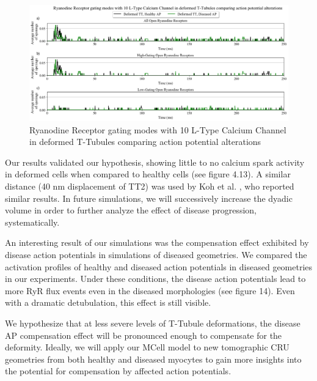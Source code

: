\documentclass[12pt]{ucsddissertation}
\begin{document}
\setcounter{figure}{13}
\begin{figure}
\centering
	\includegraphics[scale=0.4]{dndd10RyR_r_Comparison.png}
	\caption{Ryanodine Receptor gating modes with 10 L-Type Calcium Channel in deformed T-Tubules comparing action potential alterations}
\label{fig:hnhd 4 LTCC 1 AP RyR} 
\end{figure}

Our results validated our hypothesis, showing little to no calcium spark activity in deformed cells when compared to healthy cells (see figure 4.13). A similar distance (40 nm displacement of TT2) was used by Koh et al. \cite{Koh2006}, who reported similar results. In future simulations, we will successively increase the dyadic volume in order to further analyze the effect of disease progression, systematically. 


An interesting result of our simulations was the compensation effect exhibited by disease action potentials in simulations of diseased geometries. We compared the activation profiles of healthy and diseased action potentials in diseased geometries in our experiments. Under these conditions, the disease action potentials lead to more RyR flux events even in the diseased morphologies (see figure 14). Even with a dramatic detubulation, this effect is still visible.

We hypothesize that at less severe levels of T-Tubule deformations, the disease AP compensation effect will be pronounced enough to compensate for the deformity. Ideally, we will apply our MCell model to new tomographic CRU geometries from both healthy and diseased myocytes to gain more insights into the potential for compensation by affected action potentials.
\end{document}
